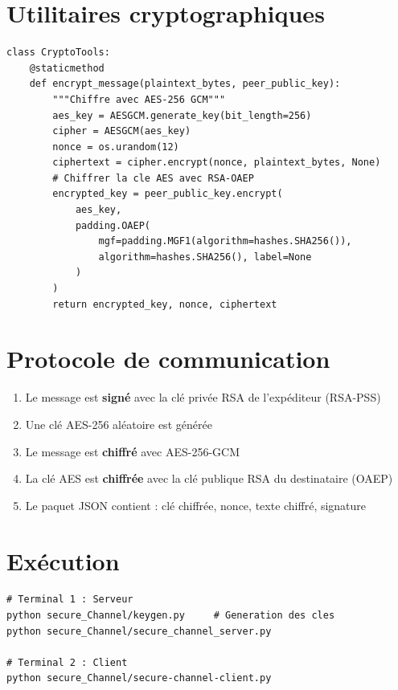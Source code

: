\documentclass[12pt,a4paper]{report}
\begin{document}
\section{Utilitaires cryptographiques}
\begin{lstlisting}[style=python,caption=crypto\_utils.py - Chiffrement hybride]
class CryptoTools:
    @staticmethod
    def encrypt_message(plaintext_bytes, peer_public_key):
        """Chiffre avec AES-256 GCM"""
        aes_key = AESGCM.generate_key(bit_length=256)
        cipher = AESGCM(aes_key)
        nonce = os.urandom(12)
        ciphertext = cipher.encrypt(nonce, plaintext_bytes, None)
        # Chiffrer la cle AES avec RSA-OAEP
        encrypted_key = peer_public_key.encrypt(
            aes_key,
            padding.OAEP(
                mgf=padding.MGF1(algorithm=hashes.SHA256()),
                algorithm=hashes.SHA256(), label=None
            )
        )
        return encrypted_key, nonce, ciphertext
\end{lstlisting}

\section{Protocole de communication}
\begin{enumerate}
    \item Le message est \textbf{signé} avec la clé privée RSA de l'expéditeur (RSA-PSS)
    \item Une clé AES-256 aléatoire est générée
    \item Le message est \textbf{chiffré} avec AES-256-GCM
    \item La clé AES est \textbf{chiffrée} avec la clé publique RSA du destinataire (OAEP)
    \item Le paquet JSON contient : clé chiffrée, nonce, texte chiffré, signature
\end{enumerate}

\section{Exécution}
\begin{lstlisting}[style=python,title=Lancement du canal securise]
# Terminal 1 : Serveur
python secure_Channel/keygen.py     # Generation des cles
python secure_Channel/secure_channel_server.py

# Terminal 2 : Client
python secure_Channel/secure-channel-client.py
\end{lstlisting}
\end{document}
